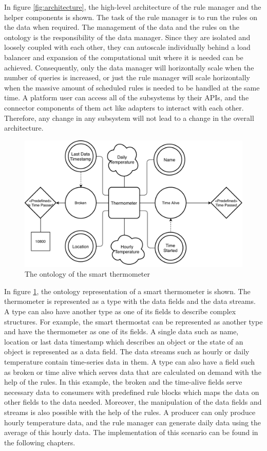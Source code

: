 In figure \ref{fig:architecture}, the high-level architecture of the rule manager and the helper components is shown. The task of the rule manager is to run the rules on the data when required. The management of the data and the rules on the ontology is the responsibility of the data manager. Since they are isolated and loosely coupled with each other, they can autoscale individually behind a load balancer and expansion of the computational unit where it is needed can be achieved. Consequently, only the data manager will horizontally scale when the number of queries is increased, or just the rule manager will scale horizontally when the massive amount of scheduled rules is needed to be handled at the same time. A platform user can access all of the subsystems by their APIs, and the connector components of them act like adapters to interact with each other. Therefore, any change in any subsystem will not lead to a change in the overall architecture.
\begin{figure}[h]
  \centering
  \includegraphics[width=\textwidth,height=\textheight,keepaspectratio]{figures/thermometer_diagram.pdf}
  \caption[Ontology Example]{The ontology of the smart thermometer}\label{fig:thermometer}
\end{figure}

In figure \ref{fig:thermometer}, the ontology representation of a smart thermometer is shown. The thermometer is represented as a type with the data fields and the data streams. A type can also have another type as one of its fields to describe complex structures. For example, the smart thermostat can be represented as another type and have the thermometer as one of its fields. A single data such as name, location or last data timestamp which describes an object or the state of an object is represented as a data field. The data streams such as hourly or daily temperature contain time-series data in them. A type can also have a field such as broken or time alive which serves data that are calculated on demand with the help of the rules. In this example, the broken and the time-alive fields serve necessary data to consumers with predefined rule blocks which maps the data on other fields to the data needed. Moreover, the manipulation of the data fields and streams is also possible with the help of the rules. A producer can only produce hourly temperature data, and the rule manager can generate daily data using the average of this hourly data. The implementation of this scenario can be found in the following chapters.


